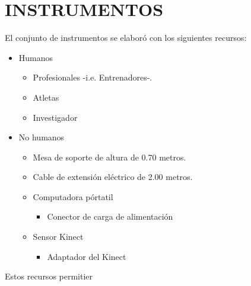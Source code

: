 \section{INSTRUMENTOS}\label{ins}
El conjunto de instrumentos se elabor\'o con los  siguientes recursos:
\begin{itemize}
\item Humanos
	\begin{itemize}
	\item Profesionales -i.e. Entrenadores-.
	\item Atletas
	\item Investigador
	\end{itemize}
\item No humanos
	\begin{itemize}
	\item Mesa de soporte de altura de 0.70 metros.
	\item Cable de extensi\'on el\'ectrico de 2.00 metros. 
	\item Computadora p\'ortatil
		\begin{itemize}
		\item Conector de carga de alimentaci\'on
		\end{itemize}
	\item Sensor Kinect
		\begin{itemize}
		\item Adaptador del Kinect
		\end{itemize}
	\end{itemize}
\end{itemize}
Estos recursos permitier
